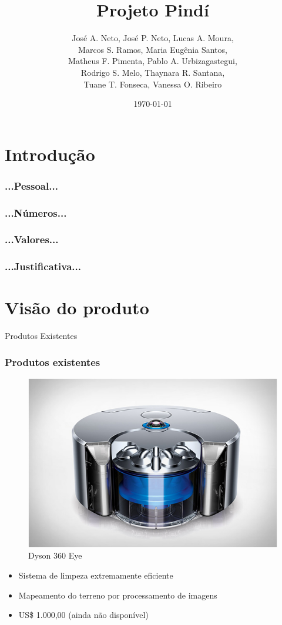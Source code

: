 \documentclass{beamer}
\title{Projeto Pindí}
\author{José A. Neto, José P. Neto, Lucas A. Moura, \\
        Marcos S. Ramos, Maria Eugênia Santos,\\
        Matheus F. Pimenta, Pablo A. Urbizagastegui,\\
        Rodrigo S. Melo, Thaynara R. Santana, \\
        Tuane T. Fonseca, Vanessa O. Ribeiro}
\date{\today}
\institute{\textbf{Universidade de Brasília - Faculdade do Gama}}
\begin{document}
\begin{frame}
  \titlepage
\end{frame}
  
\section{Introdução}
\begin{frame}
  \frametitle{...Pessoal...}
\end{frame}

\begin{frame}
  \frametitle{...Números...}
\end{frame}

\begin{frame}
 \frametitle{...Valores...}
 
\end{frame}

\begin{frame}
 \frametitle{...Justificativa...}
 
\end{frame}

\section{Visão do produto}
\begin{frame}
	Produtos Existentes	
\end{frame}

\begin{frame}
  \frametitle{Produtos existentes}
  \begin{figure}[ht]
  \includegraphics[width=.4\textwidth]{images/dyson_360.jpg}
  \caption{Dyson 360 Eye}
  \end{figure}
  \begin{itemize}
  	\item Sistema de limpeza extremamente eficiente
  	\item Mapeamento do terreno por processamento de imagens
  	\item US\$ 1.000,00 (ainda não disponível)
  \end{itemize}
\end{frame}
\end{document}
